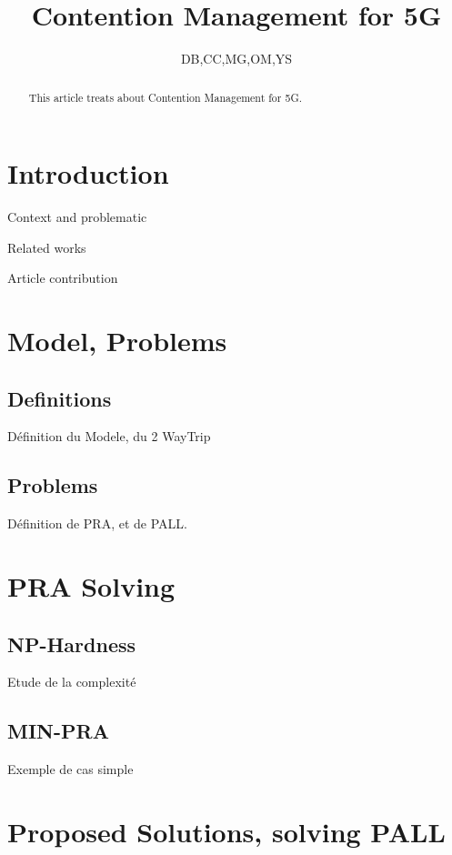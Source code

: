 \documentclass[a4paper,10pt]{article}
\title{Contention Management for 5G}
\author{DB,CC,MG,OM,YS}
\begin{document}
\maketitle

\begin{abstract}
This article treats about Contention Management for 5G.
\end{abstract}

\section{Introduction}
  \itemize
    \item Context and problematic
    \item Related works
    \item Article contribution

\section{Model, Problems}

  \subsection{Definitions}
    Définition du Modele, du 2 WayTrip
  
  \subsection{Problems}
    Définition de PRA, et de PALL.
  
\section{PRA Solving}
  
  \subsection{NP-Hardness}
    Etude de la complexité
   
  \subsection{MIN-PRA}
    Exemple de cas simple
    
\section{Proposed Solutions, solving PALL}
\end{document}
